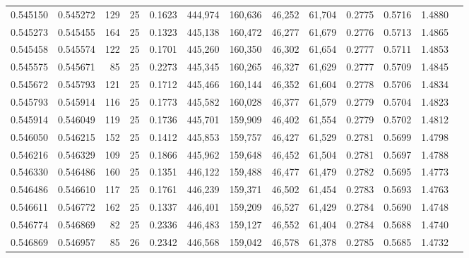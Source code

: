 \begin{tabular}{rrrrrrrrrrrrr}
0.545150 & 0.545272 &   129 &  25 &                                     0.1623 & 444,974 & 160,636 &  46,252 &  61,704 & 0.2775 & 0.5716 & 1.4880 \\
0.545273 & 0.545455 &   164 &  25 &                                     0.1323 & 445,138 & 160,472 &  46,277 &  61,679 & 0.2776 & 0.5713 & 1.4865 \\
0.545458 & 0.545574 &   122 &  25 &                                     0.1701 & 445,260 & 160,350 &  46,302 &  61,654 & 0.2777 & 0.5711 & 1.4853 \\
0.545575 & 0.545671 &    85 &  25 &                                     0.2273 & 445,345 & 160,265 &  46,327 &  61,629 & 0.2777 & 0.5709 & 1.4845 \\
0.545672 & 0.545793 &   121 &  25 &                                     0.1712 & 445,466 & 160,144 &  46,352 &  61,604 & 0.2778 & 0.5706 & 1.4834 \\
0.545793 & 0.545914 &   116 &  25 &                                     0.1773 & 445,582 & 160,028 &  46,377 &  61,579 & 0.2779 & 0.5704 & 1.4823 \\
0.545914 & 0.546049 &   119 &  25 &                                     0.1736 & 445,701 & 159,909 &  46,402 &  61,554 & 0.2779 & 0.5702 & 1.4812 \\
0.546050 & 0.546215 &   152 &  25 &                                     0.1412 & 445,853 & 159,757 &  46,427 &  61,529 & 0.2781 & 0.5699 & 1.4798 \\
0.546216 & 0.546329 &   109 &  25 &                                     0.1866 & 445,962 & 159,648 &  46,452 &  61,504 & 0.2781 & 0.5697 & 1.4788 \\
0.546330 & 0.546486 &   160 &  25 &                                     0.1351 & 446,122 & 159,488 &  46,477 &  61,479 & 0.2782 & 0.5695 & 1.4773 \\
0.546486 & 0.546610 &   117 &  25 &                                     0.1761 & 446,239 & 159,371 &  46,502 &  61,454 & 0.2783 & 0.5693 & 1.4763 \\
0.546611 & 0.546772 &   162 &  25 &                                     0.1337 & 446,401 & 159,209 &  46,527 &  61,429 & 0.2784 & 0.5690 & 1.4748 \\
0.546774 & 0.546869 &    82 &  25 &                                     0.2336 & 446,483 & 159,127 &  46,552 &  61,404 & 0.2784 & 0.5688 & 1.4740 \\
0.546869 & 0.546957 &    85 &  26 &                                     0.2342 & 446,568 & 159,042 &  46,578 &  61,378 & 0.2785 & 0.5685 & 1.4732 \\

\end{tabular}

